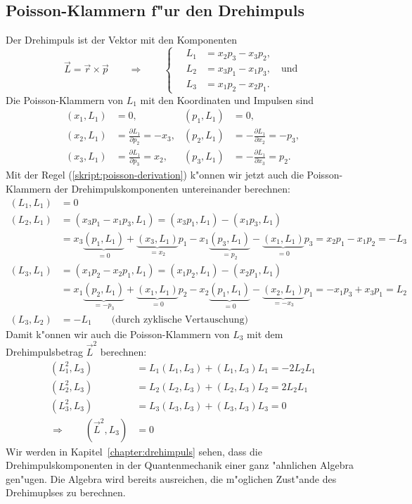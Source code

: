 \subsection{Poisson-Klammern f"ur den Drehimpuls}
Der Drehimpuls ist der Vektor mit den Komponenten
\[
\vec L=\vec r\times \vec p
\qquad\Rightarrow\qquad
\left\{\quad
\begin{aligned}
L_1&=x_2p_3-x_3p_2,\\
L_2&=x_3p_1-x_1p_3,\quad\text{und}\\
L_3&=x_1p_2-x_2p_1.
\end{aligned}
\right.
\]
Die Poisson-Klammern von $L_1$  mit den Koordinaten und Impulsen sind
\begin{align*}
(x_1,L_1)
&=
0,
&
(p_1,L_1)
&=
0,
\\
(x_2,L_1)
&=
\frac{\partial L_1}{\partial p_2}
=
-x_3,
&
(p_2,L_1)
&=
-\frac{\partial L_1}{\partial x_2}
=
-p_3,
\\
(x_3,L_1)
&=
\frac{\partial L_1}{\partial p_3}
=
x_2,
&
(p_3,L_1)
&=
-\frac{\partial L_1}{\partial x_3}
=
p_2.
\end{align*}
Mit der Regel (\ref{skript:poisson-derivation}) k"onnen wir jetzt auch die
Poisson-Klammern der Drehimpulskomponenten untereinander berechnen:
\begin{align*}
(L_1,L_1)&=0
\\
(L_2,L_1)
&=
(x_3p_1-x_1p_3,L_1)
=
(x_3p_1,L_1)-(x_1p_3,L_1)
\\
&=
x_3\underbrace{(p_1,L_1)}_{=0}+\underbrace{(x_3,L_1)}_{=x_2}p_1
-x_1\underbrace{(p_3,L_1)}_{=p_2} -\underbrace{(x_1,L_1)}_{=0}p_3
=
x_2p_1 -x_1p_2=-L_3
\\
(L_3,L_1)
&=
(x_1p_2-x_2p_1,L_1)
=
(x_1p_2,L_1)-(x_2p_1,L_1)
\\
&=
x_1\underbrace{(p_2,L_1)}_{=-p_3} + \underbrace{(x_1,L_1)}_{=0}p_2
- x_2\underbrace{(p_1,L_1)}_{=0} - \underbrace{(x_2,L_1)}_{=-x_3}p_1
=
-x_1p_3+x_3p_1
=L_2
\\
(L_3,L_2)&=-L_1\qquad\text{(durch zyklische Vertauschung)}
\end{align*}
Damit k"onnen wir auch die Poisson-Klammern von $L_3$ mit dem Drehimpulsbetrag
$\vec L^2$ berechnen:
\begin{align*}
(L_1^2,L_3)
&=
L_1(L_1,L_3)+(L_1,L_3)L_1
=
-2L_2L_1
\\
(L_2^2,L_3)
&=
L_2(L_2,L_3)+(L_2,L_3)L_2
=
2L_2L_1
\\
(L_3^2,L_3)&=L_3(L_3,L_3)+(L_3,L_3)L_3=0
\\
\Rightarrow\qquad
(\vec L^2,L_3)
&=0
\end{align*}
Wir werden in Kapitel~\ref{chapter:drehimpuls} sehen,
dass die Drehimpulskomponenten in der
Quantenmechanik einer ganz "ahnlichen Algebra gen"ugen.
Die Algebra wird bereits ausreichen, die m"oglichen Zust"ande
des Drehimuplses zu berechnen.

